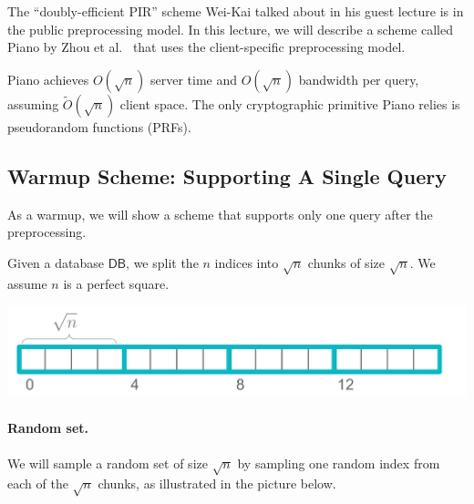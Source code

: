 The ``doubly-efficient PIR'' 
scheme Wei-Kai talked about in his guest lecture 
is in the public preprocessing model.
In this lecture, 
we will describe a scheme called Piano by Zhou et al.~\cite{zhou2023piano} 
that uses the client-specific preprocessing model.


Piano achieves $O(\sqrt{n})$ server time and $O(\sqrt{n})$ bandwidth per query, 
assuming $\widetilde{O}(\sqrt{n})$ client space. 
The only cryptographic primitive Piano relies is pseudorandom functions (PRFs).


\subsection{Warmup Scheme: Supporting A Single Query}
As a warmup, we will show a scheme that supports only one query after the preprocessing. 


Given a database $\mathsf{DB}$, we split the $n$ indices 
into $\sqrt{n}$ chunks of size $\sqrt{n}$.
We assume $n$ is a perfect square.

\begin{center}
    \includegraphics[scale=0.6]{chunks}
\end{center}

\paragraph{Random set.}
We will sample a random set 
of size $\sqrt{n}$ by sampling one random index from
each of the $\sqrt{n}$ chunks, as illustrated in the picture below. 


